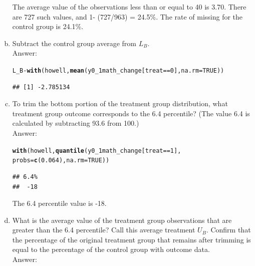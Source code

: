 \documentclass[11pt,notitlepage]{article}\usepackage[]{graphicx}\usepackage[]{color}
\makeatletter
\newcommand{\hlnum}[1]{\textcolor[rgb]{0.686,0.059,0.569}{#1}}%
\newcommand{\hlopt}[1]{\textcolor[rgb]{0,0,0}{#1}}%
\newcommand{\hlstd}[1]{\textcolor[rgb]{0.345,0.345,0.345}{#1}}%
\newcommand{\hlkwc}[1]{\textcolor[rgb]{0.333,0.667,0.333}{#1}}%
\newcommand{\hlkwd}[1]{\textcolor[rgb]{0.737,0.353,0.396}{\textbf{#1}}}%
\newenvironment{kframe}{%
 \def\at@end@of@kframe{}%
 \ifinner\ifhmode%
  \def\at@end@of@kframe{\end{minipage}}%
  \begin{minipage}{\columnwidth}%
 \fi\fi%
 \def\FrameCommand##1{\hskip\@totalleftmargin \hskip-\fboxsep
 \colorbox{shadecolor}{##1}\hskip-\fboxsep
     \hskip-\linewidth \hskip-\@totalleftmargin \hskip\columnwidth}%
 \MakeFramed {\advance\hsize-\width
   \@totalleftmargin\z@ \linewidth\hsize
   \@setminipage}}%
 {\par\unskip\endMakeFramed%
 \at@end@of@kframe}
\newenvironment{knitrout}{}{} %
\makeatother
\begin{document}
\begin{enumerate}[a)]
The average value of the observations less than or equal to 40 is 3.70. There are 727 such values, and  1- (727/963) = 24.5\%. The rate of missing for the control group is 24.1\%.  


\item Subtract the control group average from $L_B$.\\
Answer:\\
\begin{knitrout}
\color{fgcolor}\begin{kframe}
\begin{alltt}
\hlstd{L_B} \hlopt{-} \hlkwd{with}\hlstd{(howell,} \hlkwd{mean}\hlstd{(y0_1math_change[treat}\hlopt{==}\hlnum{0}\hlstd{],} \hlkwc{na.rm}\hlstd{=}\hlnum{TRUE}\hlstd{))}
\end{alltt}
\begin{verbatim}
## [1] -2.785134
\end{verbatim}
\end{kframe}
\end{knitrout}


\item To trim the bottom portion of the treatment group distribution, what treatment group outcome corresponds to the 6.4 percentile? (The value 6.4 is calculated by subtracting 93.6 from 100.)\\
Answer:\\
\begin{knitrout}
\color{fgcolor}\begin{kframe}
\begin{alltt}
\hlkwd{with}\hlstd{(howell,} \hlkwd{quantile}\hlstd{(y0_1math_change[treat}\hlopt{==}\hlnum{1}\hlstd{],}
                      \hlkwc{probs} \hlstd{=} \hlkwd{c}\hlstd{(}\hlnum{0.064}\hlstd{),}\hlkwc{na.rm}\hlstd{=}\hlnum{TRUE}\hlstd{))}
\end{alltt}
\begin{verbatim}
## 6.4% 
##  -18
\end{verbatim}
\end{kframe}
\end{knitrout}
The 6.4 percentile value is -18. 

\item What is the average value of the treatment group observations that are greater than the 6.4 percentile? Call this average treatment $U_B$. Confirm that the percentage of the original treatment group that remains after trimming is equal to the percentage of the control group with outcome data.\\
Answer:\\


\end{enumerate}
\end{document}
